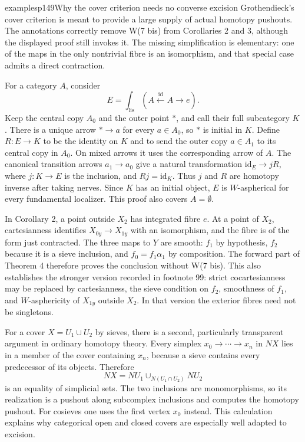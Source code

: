 \begin{dcomment}{examples}{p149}{Why the cover criterion needs no converse excision}
Grothendieck's cover criterion is meant to provide a large supply of actual homotopy pushouts. The annotations correctly remove W(7 bis) from Corollaries 2 and 3, although the displayed proof still invokes it. The missing simplification is elementary: one of the maps in the only nontrivial fibre is an isomorphism, and that special case admits a direct contraction.

For a category $A$, consider
\[
 E=\int_{\mathrm{lis}}(A\xleftarrow{\mathrm{id}}A\longrightarrow e).
\]
Keep the central copy $A_0$ and the outer point $*$, and call their full subcategory $K$. There is a unique arrow $*\to a$ for every $a\in A_0$, so $*$ is initial in $K$. Define $R:E\to K$ to be the identity on $K$ and to send the outer copy $a\in A_1$ to its central copy in $A_0$. On mixed arrows it uses the corresponding arrow of $A$. The canonical transition arrows $a_1\to a_0$ give a natural transformation $\mathrm{id}_E\to jR$, where $j:K\to E$ is the inclusion, and $Rj=\mathrm{id}_K$. Thus $j$ and $R$ are homotopy inverse after taking nerves. Since $K$ has an initial object, $E$ is $W$-aspherical for every fundamental localizer. This proof also covers $A=\emptyset$.

In Corollary 2, a point outside $X_2$ has integrated fibre $e$. At a point of $X_2$, cartesianness identifies $X_{0y}\to X_{1y}$ with an isomorphism, and the fibre is of the form just contracted. The three maps to $Y$ are smooth: $f_1$ by hypothesis, $f_2$ because it is a sieve inclusion, and $f_0=f_1\alpha_1$ by composition. The forward part of Theorem 4 therefore proves the conclusion without W(7 bis). This also establishes the stronger version recorded in footnote 99: strict cocartesianness may be replaced by cartesianness, the sieve condition on $f_2$, smoothness of $f_1$, and $W$-asphericity of $X_{1y}$ outside $X_2$. In that version the exterior fibres need not be singletons.

For a cover $X=U_1\cup U_2$ by sieves, there is a second, particularly transparent argument in ordinary homotopy theory. Every simplex $x_0\to\cdots\to x_n$ in $NX$ lies in a member of the cover containing $x_n$, because a sieve contains every predecessor of its objects. Therefore
\[
 NX=NU_1\cup_{N(U_1\cap U_2)}NU_2
\]
is an equality of simplicial sets. The two inclusions are monomorphisms, so its realization is a pushout along subcomplex inclusions and computes the homotopy pushout. For cosieves one uses the first vertex $x_0$ instead. This calculation explains why categorical open and closed covers are especially well adapted to excision.


\end{dcomment}
